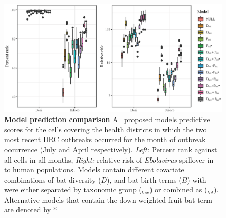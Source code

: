 \documentclass[a4paper,twoside, onecolumn]{article}
\begin{document}
	\begin{figure}[h!]
		\centering
		\includegraphics[width=.95\linewidth]{Fig_altModelSeltection.eps}
		\caption{\textbf{Model prediction comparison} All proposed models predictive scores for the cells covering the health districts in which the two most recent DRC outbreaks occurred for the month of outbreak occurrence (July and April respectively). \textit{Left:} Percent rank against all cells in all months, \textit{Right:} relative risk of \textit{Ebolavirus} spillover in to human populations. Models contain different covariate combinations of bat diversity ($D$), and bat birth terms ($B$) with were either separated by taxonomic group ($_{tax}$) or combined as ($_{tot}$). Alternative models that contain the down-weighted fruit bat term are denoted by *}
		\label{fig:F_alt selection}
	\end{figure}
\end{document}
